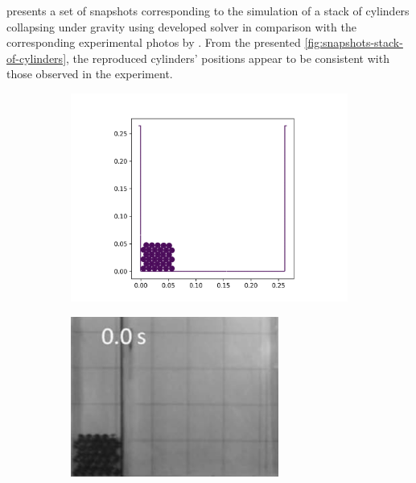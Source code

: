  presents a set of snapshots
corresponding to the simulation of a stack of cylinders collapsing under gravity
using developed solver in comparison with the corresponding experimental photos
by \parencite{zhang_simulation_2009}. From the presented
\cref{fig:snapshots-stack-of-cylinders}, the reproduced cylinders' positions
appear to be consistent with those observed in the experiment.
\begin{figure}[!htpb]
  \centering
  \begin{subfigure}{0.48\textwidth}
    \centering
    \includegraphics[width=1.0\textwidth]{figures/rfc/figures/stack_of_cylinders_2d/Mohseni_Vyas/time0}
  \end{subfigure}
  \begin{subfigure}{0.48\textwidth}
    \centering
    \includegraphics[width=0.75\textwidth]{images/rfc/images/stack_of_cylinders_experimental_images/time0}
  \end{subfigure}


\end{figure}
